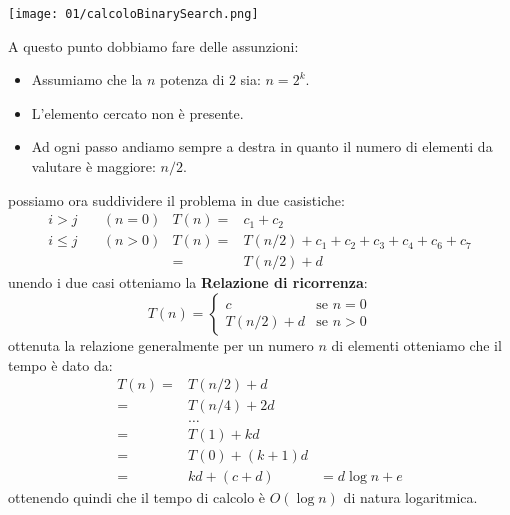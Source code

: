             \texttt{[image: 01/calcoloBinarySearch.png]}
            
            A questo punto dobbiamo fare delle assunzioni:
            \begin{itemize}
                \item Assumiamo che la $ n $ potenza di $ 2 $ sia: $ n = 2^k $.
                \item L'elemento cercato non è presente.
                \item Ad ogni passo andiamo sempre a destra in quanto il numero di elementi da valutare è maggiore: $ n/2 $.
            \end{itemize}
            possiamo ora suddividere il problema in due casistiche:
            $$
                \begin{aligned}
                    i>j\quad & (n=0) & T(n)=&c_1 + c_2\\
                    i\leq j\quad & (n>0) & T(n)=&T(n/2) + c_1 + c_2 + c_3 + c_4 + c_6 + c_7\\
                        &&=&T(n/2) + d
                \end{aligned}
            $$
            unendo i due casi otteniamo la \textbf{Relazione di ricorrenza}:
            $$
                T(n)=
                    \begin{cases}
                        c& \text{se } n=0\\
                        T(n/2) +d & \text{se } n>0
                    \end{cases}
            $$
            ottenuta la relazione generalmente per un numero $ n $ di elementi otteniamo che il tempo è dato da:
            $$
                \begin{aligned}
                    T(n)=&T(n/2)+d&\\
                    =&T(n/4)+2d&\\
                    &\hdots\\
                    =&T(1)+kd&\\
                    =&T(0)+(k+1)d&\\
                    =&kd+(c+d) &= d\log n + e
                \end{aligned}
            $$
            ottenendo quindi che il tempo di calcolo è $ O(\log n) $ di natura logaritmica.

